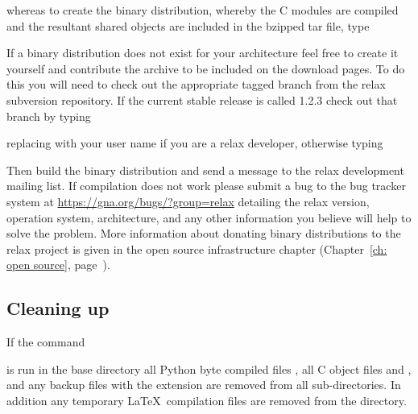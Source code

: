 
whereas to create the binary distribution, whereby the C modules are compiled and the resultant shared objects are included in the bzipped tar file, type


If a binary distribution does not exist for your architecture feel free to create it yourself and contribute the archive to be included on the download pages.  To do this you will need to check out the appropriate tagged branch from the relax subversion repository.  If the current stable release is called 1.2.3 check out that branch by typing


replacing  with your user name if you are a relax developer, otherwise typing


Then build the binary distribution and send a message to the relax development mailing list.  If compilation does not work please submit a bug to the bug tracker system at \href{https://gna.org/bugs/?group=relax}{https://gna.org/bugs/?group=relax} detailing the relax version, operation system, architecture, and any other information you believe will help to solve the problem.  More information about donating binary distributions to the relax project is given in the open source infrastructure chapter (Chapter~\ref{ch: open source}, page~\pageref{ch: open source}).



\subsection{Cleaning up}

If the command


is run in the base directory all Python byte compiled files , all C object files  and , and any backup files with the extension  are removed from all sub-directories.  In addition any temporary \LaTeX\ compilation files are removed from the  directory.

